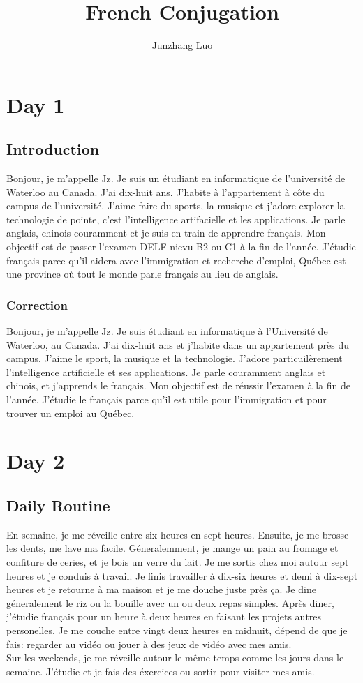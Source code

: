 \documentclass{book}
\title{French Conjugation}
\author{Junzhang Luo}
\begin{document}
\tableofcontents

\chapter{Day 1}
    \section{Introduction}
        Bonjour, je m'appelle Jz. Je suis un étudiant en informatique de l'université de Waterloo au Canada.
        J'ai dix-huit ans. J'habite à l'appartement à côte du campus de l'université. 
        J'aime faire du sports, la musique et j'adore explorer la technologie de pointe, c'est l'intelligence artifacielle et les applications.
        Je parle anglais, chinois couramment et je suis en train de apprendre français. Mon objectif est de passer l'examen DELF nievu B2 ou C1 
        à la fin de l'année.
        J'étudie français parce qu'il aidera avec l'immigration et recherche d'emploi, Québec est une province où tout le monde parle français au lieu de anglais.

    \subsection*{Correction}
        Bonjour, je m'appelle Jz. Je suis étudiant en informatique à l'Université de Waterloo, au Canada. 
        J'ai dix-huit ans et j'habite dans un appartement près du campus.
        J'aime le sport, la musique et la technologie.
        J'adore particuilèrement l'intelligence artificielle et ses applications. 
        Je parle couramment anglais et chinois, et j'apprends le français. 
        Mon objectif est de réussir l'examen à la fin de l'année. J'étudie le français parce qu'il est utile pour l'immigration et pour trouver un emploi au Québec.

\chapter{Day 2}
    \section{Daily Routine}
        En semaine, je me réveille entre six heures en sept heures. Ensuite, je me brosse les dents, me lave ma facile.
        Géneralemment, je mange un pain au fromage et confiture de ceries, et je bois un verre du lait.
        Je me sortis chez moi autour sept heures et je conduis à travail. 
        Je finis travailler à dix-six heures et demi à dix-sept heures et je retourne à ma maison et je me douche juste près ça.
        Je dine géneralement le riz ou la bouille avec un ou deux repas simples.
        Après diner, j'étudie français pour un heure à deux heures en faisant les projets autres personelles.
        Je me couche entre vingt deux heures en midnuit, dépend de que je fais: regarder au vidéo ou jouer à des jeux de vidéo avec mes amis.
        \\
        Sur les weekends, je me réveille autour le même temps comme les jours dans le semaine. J'étudie et je fais des éxercices ou sortir pour visiter mes amis.
\end{document}
